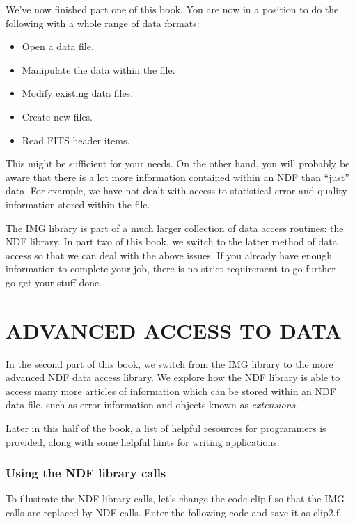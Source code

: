We've now finished part one of this book. You are now in a position 
to do the following with a whole range of data formats:

\begin{itemize}
\item Open a data file.
\item Manipulate the data within the file.
\item Modify existing data files.
\item Create new files.
\item Read FITS header items.
\end{itemize}

This might be sufficient for your needs. On the other hand, you will
probably be aware that there is a lot more information contained within an
NDF than ``just'' data. For example, we have not dealt with access to 
statistical error and quality information stored within the file. 

The IMG library is part of a much larger collection of data access routines:
the NDF library. In part two of this book, we switch to the latter method
of data access so that we can deal with the above issues. If you already have
enough information to complete your job, there is no strict requirement 
to go further -- go get your stuff done. 

\newpage

\part{ADVANCED ACCESS TO DATA}

\markright{\stardocname}

In the second part of this book, we switch from the IMG library to the
more advanced NDF data access library. We explore how the NDF library
is able to access many more articles of information which can be
stored within an NDF data file, such as error information and 
objects known as {\em extensions}.

Later in this half of the book, a list of helpful resources for
programmers is provided, along with some helpful hints for 
writing applications.

\newpage

\section{Using the NDF library calls}

To illustrate the NDF library calls, let's change the code {\sf clip.f} so
that the {\sf IMG} calls are replaced by {\sf NDF} calls. Enter the
following code and save it as {\sf clip2.f}. 

